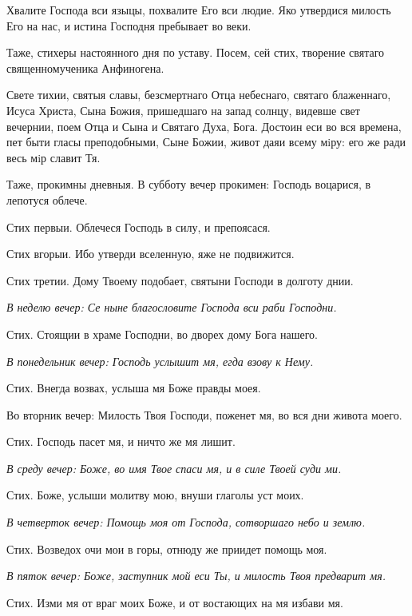 Хвалите Господа вси языцы, похвалите Его вси людие. Яко утвердися милость Его на нас, и истина Господня пребывает во веки.

Таже, стихеры настоянного дня по уставу. Посем, сей стих, творение святаго священномученика Анфиногена.

Свете тихии, святыя славы, безсмертнаго Отца небеснаго, святаго блаженнаго, Исуса Христа, Сына Божия, пришедшаго на запад солнцу, видевше свет вечернии, поем Отца и Сына и Святаго Духа, Бога. Достоин еси во вся времена, пет быти гласы преподобными, Сыне Божии, живот даяи всему мiру: его же ради весь мiр славит Тя.

Таже, прокимны дневныя. В субботу вечер прокимен: Господь воцарися, в лепотуся облече. 

Стих первыи. Облечеся Господь в силу, и препоясася.

Стих вгорыи. Ибо утверди вселенную, яже не подвижится.

Стих третии. Дому Твоему подобает, святыни Господи в долготу днии.


\itshape В неделю вечер:\normalfont{} Се ныне благословите Господа вси раби Господни.

Стих. Стоящии в храме Господни, во дворех дому Бога нашего.


\itshape В понедельник вечер:\normalfont{} Господь услышит мя, егда взову к Нему.

Стих. Внегда возвах, услыша мя Боже правды моея.


Во вторник вечер: Милость Твоя Господи, поженет мя, во вся дни живота моего.

Стих. Господь пасет мя, и ничто же мя лишит.


\itshape В среду вечер:\normalfont{} Боже, во имя Твое спаси мя, и в силе Твоей суди ми.

Стих. Боже, услыши молитву мою, внуши глаголы уст моих.


\itshape В четверток вечер:\normalfont{} Помощь моя от Господа, сотворшаго небо и землю.

Стих. Возведох очи мои в горы, отнюду же приидет помощь моя.


\itshape В пяток вечер:\normalfont{} Боже, заступник мой еси Ты, и милость Твоя предварит мя.

Стих. Изми мя от враг моих Боже, и от востающих на мя избави мя.





